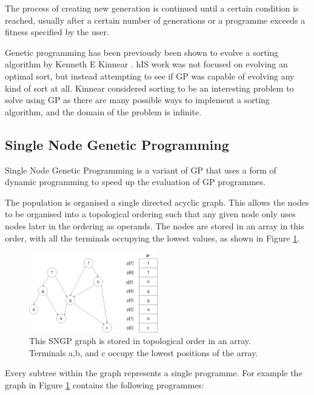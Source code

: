 \documentclass{article}
\begin{document}
			The process of creating new generation is continued until a certain condition is reached, usually after a certain number of generations or a programme exceeds a fitness specified by the user.
			
			Genetic programming has been previously been shown to evolve a sorting algorithm by Kenneth E Kinnear \cite{kinnear_generality_1993,kinnear_evolving_1993}. hIS work was not focused on evolving an optimal sort, but instead attempting to see if GP was capable of evolving any kind of sort at all. Kinnear considered sorting to be an interesting problem to solve using GP as there are many possible ways to implement a sorting algorithm, and the domain of the problem is infinite.
			
		\subsection{Single Node Genetic Programming}
		
			Single Node Genetic Programming is a variant of GP that uses a form of dynamic programming to speed up the evaluation of GP programmes.
			
			The population is organised a single directed acyclic graph. This allows the nodes to be organised into a topological ordering such that any given node only uses nodes later in the ordering as operands. The nodes are stored in an array in this order, with all the terminals occupying the lowest values, as shown in Figure \ref{fig:sngp_graph}.
			
			\begin{figure}[h]
				\centering
				\includegraphics[width=0.5\textwidth]{8_sngp_graph}
				\caption{This SNGP graph is stored in topological order in an array. Terminals a,b, and c occupy the lowest positions of the array.}
				\label{fig:sngp_graph}
			\end{figure}
		
			Every subtree within the graph represents a single programme. For example the graph in Figure \ref{fig:sngp_graph} contains the following programmes:
			
\end{document}
